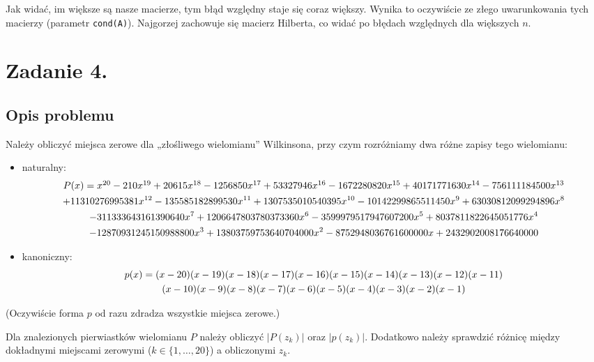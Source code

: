 \documentclass[10pt]{article}
\begin{document}
Jak widać, im większe są nasze macierze, tym błąd względny staje się coraz większy. Wynika to oczywiście ze złego uwarunkowania tych macierzy (parametr \texttt{cond(A)}). Najgorzej zachowuje się macierz Hilberta, co widać po błędach względnych dla większych $n$.

\section{Zadanie 4.}

\subsection{Opis problemu}

Należy obliczyć miejsca zerowe dla „złośliwego wielomianu” Wilkinsona, przy czym rozróżniamy dwa różne zapisy tego wielomianu:
\begin{itemize}
    \item naturalny:
    \begin{multline}
    $$
        P(x) = x^{20} - 210x^{19} + 20615x^{18} - 1256850x^{17} + 53327946x^{16} -1672280820x^{15} + 40171771630x^{14} - 756111184500x^{13}\\
        +11310276995381x^{12} - 135585182899530x^{11}+ 1307535010540395x^{10} - 10142299865511450x^{9} +63030812099294896x^{8}\\
        - 311333643161390640x^{7} +1206647803780373360x^{6} - 3599979517947607200x^{5} +8037811822645051776x^{4}\\
        - 12870931245150988800x^{3} +13803759753640704000x^{2} - 8752948036761600000x +2432902008176640000
    $$
    \end{multline}
    \item kanoniczny:
    \begin{multline}
        $$
        p(x) = (x - 20) (x - 19) (x - 18) (x - 17) (x - 16) (x - 15) (x - 14) (x - 13) (x - 12) (x - 11)\\
        (x - 10) (x - 9) (x - 8) (x - 7) (x - 6) (x - 5) (x - 4) (x - 3) (x - 2)(x - 1)
        $$
    \end{multline}
\end{itemize}

\noindent (Oczywiście forma $p$ od razu zdradza wszystkie miejsca zerowe.)

\noindent Dla znalezionych pierwiastków wielomianu $P$ należy obliczyć $|P(z_k)|$ oraz $|p(z_k)|$. Dodatkowo należy sprawdzić różnicę między dokładnymi miejscami zerowymi ($k \in \{1,\dots,20\}$) a obliczonymi $z_k$.
\end{document}
